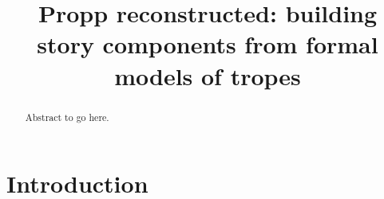 \documentclass{article}
\title{Propp reconstructed: building story components from formal models of tropes}
\author[A]{\fnms{Matthew} \snm{Thompson}}, %
\author[B]{\fnms{Julian} \snm{Padget}}
\begin{document}
\maketitle

\begin{abstract}
  Abstract to go here.
\end{abstract}

\section{Introduction}



\end{document}
